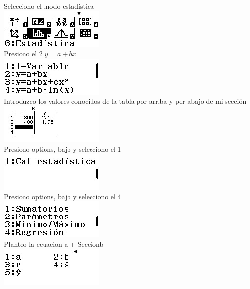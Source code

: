 \documentclass[10pt,a4paper]{article}
\begin{document}
Selecciono el modo estadística
\\
\includegraphics[]{src/01.jpg}\\

Presiono el 2 $y = a+bx$
\\
\includegraphics[]{src/02.jpg}\\

Introduzco los valores conocidos de la tabla por arriba y por abajo de mi sección
\\

\includegraphics[]{src/03.jpg}\\

Presiono options, bajo y selecciono el 1 \\

\includegraphics[]{src/04.jpg}\\

Presiono options, bajo y selecciono el 4 
\\

\includegraphics[]{src/05.jpg}\\

Planteo la ecuacion a + Seccion\cdot b
\\
\includegraphics[]{src/06.jpg}\\
\end{document}
